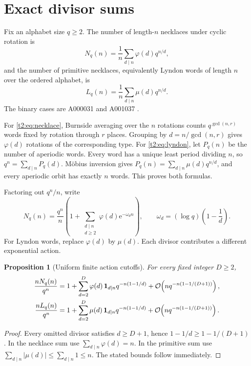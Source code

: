 \documentclass[11pt,openany]{book}
\numberwithin{equation}{chapter}
\theoremstyle{plain}
\newtheorem{proposition}[theorem]{Proposition}
\theoremstyle{definition}
\theoremstyle{remark}
\newcommand{\ee}{\mathrm e}
\begin{document}
\section{Exact divisor sums}

Fix an alphabet size $q\ge2$. The number of length-$n$ necklaces under cyclic rotation is
\begin{equation}
 N_q(n)=\frac1n\sum_{d\mid n}\varphi(d)q^{n/d},
 \label{t2:eq:necklace}
\end{equation}
and the number of primitive necklaces, equivalently Lyndon words of length $n$ over the ordered alphabet, is
\begin{equation}
 L_q(n)=\frac1n\sum_{d\mid n}\mu(d)q^{n/d}.
 \label{t2:eq:lyndon}
\end{equation}
The binary cases are A000031 and A001037 \cite{oeisnecklace,oeislyndon}.

For \eqref{t2:eq:necklace}, Burnside averaging over the $n$ rotations counts $q^{\gcd(n,r)}$ words fixed by rotation through $r$ places. Grouping by $d=n/\gcd(n,r)$ gives $\varphi(d)$ rotations of the corresponding type. For \eqref{t2:eq:lyndon}, let $P_q(n)$ be the number of aperiodic words. Every word has a unique least period dividing $n$, so $q^n=\sum_{d\mid n}P_q(d)$. M\"obius inversion gives $P_q(n)=\sum_{d\mid n}\mu(d)q^{n/d}$, and every aperiodic orbit has exactly $n$ words. This proves both formulas.

Factoring out $q^n/n$, write
\begin{equation}
 N_q(n)=\frac{q^n}{n}\left(1+
 \sum_{\substack{d\mid n\\d\ge2}}\varphi(d)\ee^{-\omega_dn}\right),
 \qquad \omega_d=(\log q)\left(1-\frac1d\right).
 \label{t2:eq:necklace-sectors}
\end{equation}
For Lyndon words, replace $\varphi(d)$ by $\mu(d)$. Each divisor contributes a different exponential action.

\begin{proposition}[Uniform finite action cutoffs]
\label{t2:prop:necklace-cutoff}
For every fixed integer $D\ge2$,
\begin{align}
 \frac{nN_q(n)}{q^n}
 &=1+\sum_{d=2}^{D}\varphi(d)\,\mathbf1_{d\mid n}
             q^{-n(1-1/d)}
    +\mathcal O\!\left(nq^{-n(1-1/(D+1))}\right),\nonumber\\
 \frac{nL_q(n)}{q^n}
 &=1+\sum_{d=2}^{D}\mu(d)\,\mathbf1_{d\mid n}
             q^{-n(1-1/d)}
    +\mathcal O\!\left(nq^{-n(1-1/(D+1))}\right).
 \label{t2:eq:necklace-cutoff}
\end{align}
\end{proposition}
\begin{proof}
Every omitted divisor satisfies $d\ge D+1$, hence
$1-1/d\ge1-1/(D+1)$. In the necklace sum use
$\sum_{d\mid n}\varphi(d)=n$. In the primitive sum use
$\sum_{d\mid n}|\mu(d)|\le\sum_{d\mid n}1\le n$.
The stated bounds follow immediately.
\end{proof}
\end{document}

